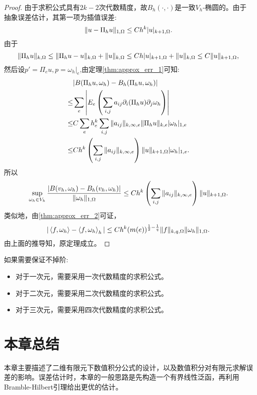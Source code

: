 \begin{proof}
    由于求积公式具有$2k-2$次代数精度，故$B_{h}(\cdot,\cdot)$是一致$V_{h}$-椭圆的。由于抽象误差估计，其第一项为插值误差:
    \begin{equation}
        \|u-\Pi_{h}u\|_{1,\Omega}\le Ch^{k}|u|_{k+1,\Omega}.
    \end{equation}
    由于
    \begin{equation}
        \|\Pi_{h}u\|_{k,\Omega}\le\|\Pi_{h}u-u\|_{k,\Omega}+\|u\|_{k,\Omega}\le Ch|u|_{k+1,\Omega}+\|u\|_{k,\Omega}\le C\|u\|_{k+1,\Omega},
    \end{equation}
    然后设$p'=\Pi_{e}u,p=\omega_{h}|_{e}$,由定理\ref{thm:approx_err_1}可知:
    \begin{equation}
        \begin{aligned}
            &|B(\Pi_{h}u,\omega_{h})-B_{h}(\Pi_{h}u,\omega_{h})|\\
            \le&\sum_{e}\left|E_{e}\left(\sum_{i,j}a_{ij}\partial_{i}(\Pi_{h}u)\partial_{j}\omega_{h}\right)\right|\\
            \le&C\sum_{e}h_{e}^{k}\sum_{i,j}\|a_{ij}\|_{k,\infty,e}\|\Pi_{h}u\|_{k,e}|\omega_{h}|_{1,e}\\
            \le& Ch^{k}\left(\sum_{i,j}\|a_{ij}\|_{k,\infty,e}\right)\|u\|_{k+1,\Omega}|\omega_{h}|_{1,e}.
        \end{aligned}
    \end{equation}
    所以
    \begin{equation}
        \sup_{\omega_{h}\in V_{h}}\frac{|B(v_{h},\omega_{h})-B_{h}(v_{h},\omega_{h})|}{\|\omega_{h}\|_{1,\Omega}}\le Ch^{k}\left(\sum_{i,j}\|a_{ij}\|_{k,\infty,e}\right)\|u\|_{k+1,\Omega}.
    \end{equation}
    类似地，由\ref{thm:approx_err_2}可证，
    \begin{equation}
        |\left<f,\omega_{h}\right>-\left<f,\omega_{h}\right>_{h}|\le Ch^{k}(m(e))^{\frac{1}{2}-\frac{1}{q}}\|f\|_{k,q,\Omega}\|\omega_{h}\|_{1,\Omega}.
    \end{equation}
    由上面的推导知，原定理成立。
\end{proof}
\begin{remark}
    如果需要保证不掉阶:
    \begin{itemize}
        \item 对于一次元，需要采用一次代数精度的求积公式。
        \item 对于二次元，需要采用二次代数精度的求积公式。
        \item 对于三次元，需要采用四次代数精度的求积公式。
    \end{itemize}
\end{remark}
\section{本章总结}
本章主要描述了二维有限元下数值积分公式的设计，以及数值积分对有限元求解误差的影响。误差估计时，本章的一般思路是先构造一个有界线性泛函，再利用Bramble-Hilbert引理给出更优的估计。